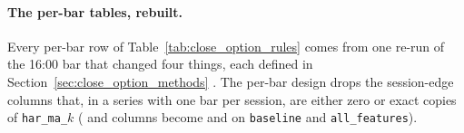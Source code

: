 \paragraph{The per-bar tables, rebuilt.} Every per-bar row of
Table~\ref{tab:close_option_rules} comes from one re-run of the 16:00 bar that
changed four things, each defined in Section~\ref{sec:close_option_methods}%
. The per-bar design drops the
\cmNDup{} session-edge columns that, in a series with one bar per session, are %
either zero or exact copies of \texttt{har\_ma\_}$k$ (\cmPOldBase{} and \cmPOldAll{} columns %
become \cmPNewBase{} and \cmPNewAll{} on \texttt{baseline} and \texttt{all\_features}).
